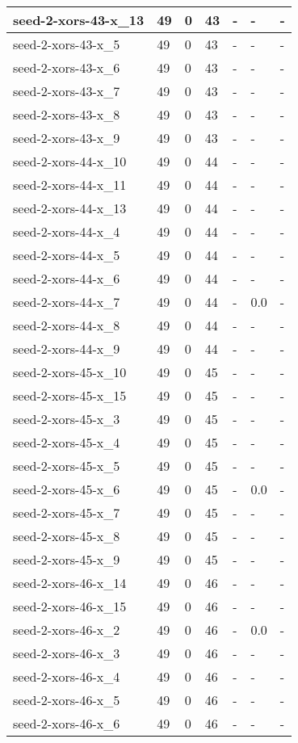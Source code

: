 \begin{scriptsize}
\begin{longtable}{|p{5cm}|l|l|l|l|l|l|}
seed-2-xors-43-x\_13&49&0&43&-&-&- \\ \hline 
seed-2-xors-43-x\_5&49&0&43&-&-&- \\ \hline 
seed-2-xors-43-x\_6&49&0&43&-&-&- \\ \hline 
seed-2-xors-43-x\_7&49&0&43&-&-&- \\ \hline 
seed-2-xors-43-x\_8&49&0&43&-&-&- \\ \hline 
seed-2-xors-43-x\_9&49&0&43&-&-&- \\ \hline 
seed-2-xors-44-x\_10&49&0&44&-&-&- \\ \hline 
seed-2-xors-44-x\_11&49&0&44&-&-&- \\ \hline 
seed-2-xors-44-x\_13&49&0&44&-&-&- \\ \hline 
seed-2-xors-44-x\_4&49&0&44&-&-&- \\ \hline 
seed-2-xors-44-x\_5&49&0&44&-&-&- \\ \hline 
seed-2-xors-44-x\_6&49&0&44&-&-&- \\ \hline 
seed-2-xors-44-x\_7&49&0&44&-&0.0&- \\ \hline 
seed-2-xors-44-x\_8&49&0&44&-&-&- \\ \hline 
seed-2-xors-44-x\_9&49&0&44&-&-&- \\ \hline 
seed-2-xors-45-x\_10&49&0&45&-&-&- \\ \hline 
seed-2-xors-45-x\_15&49&0&45&-&-&- \\ \hline 
seed-2-xors-45-x\_3&49&0&45&-&-&- \\ \hline 
seed-2-xors-45-x\_4&49&0&45&-&-&- \\ \hline 
seed-2-xors-45-x\_5&49&0&45&-&-&- \\ \hline 
seed-2-xors-45-x\_6&49&0&45&-&0.0&- \\ \hline 
seed-2-xors-45-x\_7&49&0&45&-&-&- \\ \hline 
seed-2-xors-45-x\_8&49&0&45&-&-&- \\ \hline 
seed-2-xors-45-x\_9&49&0&45&-&-&- \\ \hline 
seed-2-xors-46-x\_14&49&0&46&-&-&- \\ \hline 
seed-2-xors-46-x\_15&49&0&46&-&-&- \\ \hline 
seed-2-xors-46-x\_2&49&0&46&-&0.0&- \\ \hline 
seed-2-xors-46-x\_3&49&0&46&-&-&- \\ \hline 
seed-2-xors-46-x\_4&49&0&46&-&-&- \\ \hline 
seed-2-xors-46-x\_5&49&0&46&-&-&- \\ \hline 
seed-2-xors-46-x\_6&49&0&46&-&-&- \\ \hline 

\end{longtable}
\end{scriptsize}
